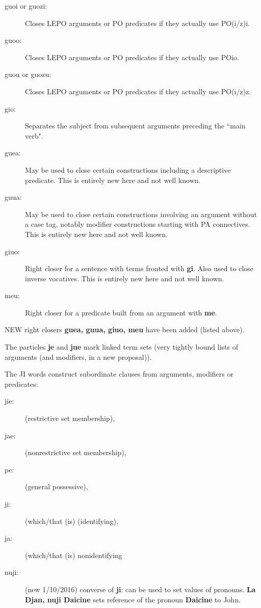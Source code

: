 \documentclass[12pt]{book}
\begin{document}
{\begin{description}
\item[guoi or guozi:] Closes LEPO arguments or PO predicates if they actually use PO(i/z)i.

\item[guoo:] Closes LEPO arguments or PO predicates if they actually use POio.

\item[guou or guozu:] Closes LEPO arguments or PO predicates if they actually use PO(i/z)z.

\item[gio:]  Separates the subject from subsequent arguments preceding the ``main verb".

\item[guea:]  May be used to close certain constructions including a descriptive predicate.  This is entirely new here and not well known.

\item[guua:]  May be used to close certain constructions involving an argument without a case tag, notably modifier constructions starting with PA connectives.  This is entirely new here and not well known.

\item[giuo:]  Right closer for a sentence with terms fronted with {\bf gi}.  Also used to close inverse vocatives.  This is entirely new here and not well known.

\item[meu:]  Right closer for a predicate built from an argument with {\bf me}.

\end{description}

NEW right closers {\bf guea, guua, giuo, meu\/} have been added (listed above).

The particles {\bf je} and {\bf jue} mark linked term sets (very tightly bound lists of arguments (and modifiers, in a new proposal)).

The JI words  construct subordinate clauses from arguments,  modifiers or predicates:

\begin{description}
\item[jie:] (restrictive set membership), \item[jae:] (nonrestrictive set membership), \item[pe:] (general possessive), \item[ji:] (which/that (is) (identifying), \item[ja:] (which/that (is) nonidentifying\item[nuji:]  (new 1/10/2016)  converse of {\bf ji}:  can be used to set values of pronouns.  {\bf La Djan, nuji Daicine} sets reference of the pronoun {\bf Daicine} to
John.


\end{description}}
\end{document}
